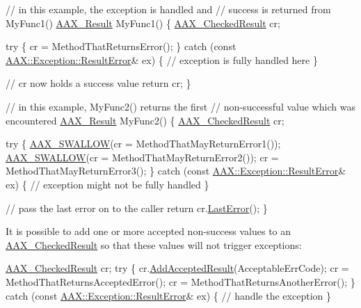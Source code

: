 \begin{DoxyCode}
\textcolor{comment}{// in this example, the exception is handled and}
\textcolor{comment}{// success is returned from MyFunc1()}
\hyperlink{a00149_a4d8f69a697df7f70c3a8e9b8ee130d2f}{AAX\_Result} MyFunc1()
\{
  \hyperlink{a00019}{AAX\_CheckedResult} cr;

  \textcolor{keywordflow}{try} \{
    cr = MethodThatReturnsError();
  \} \textcolor{keywordflow}{catch} (\textcolor{keyword}{const} \hyperlink{a00147}{AAX::Exception::ResultError}& ex) \{
    \textcolor{comment}{// exception is fully handled here}
  \}
  
  \textcolor{comment}{// cr now holds a success value}
  \textcolor{keywordflow}{return} cr;
\}

\textcolor{comment}{// in this example, MyFunc2() returns the first}
\textcolor{comment}{// non-successful value which was encountered}
\hyperlink{a00149_a4d8f69a697df7f70c3a8e9b8ee130d2f}{AAX\_Result} MyFunc2()
\{
  \hyperlink{a00019}{AAX\_CheckedResult} cr;

  \textcolor{keywordflow}{try} \{
    \hyperlink{a00208_a8f177823e9388c5163d1b402a9069bce}{AAX\_SWALLOW}(cr = MethodThatMayReturnError1());
    \hyperlink{a00208_a8f177823e9388c5163d1b402a9069bce}{AAX\_SWALLOW}(cr = MethodThatMayReturnError2());
    cr = MethodThatMayReturnError3();
  \} \textcolor{keywordflow}{catch} (\textcolor{keyword}{const} \hyperlink{a00147}{AAX::Exception::ResultError}& ex) \{
    \textcolor{comment}{// exception might not be fully handled}
  \}
  
  \textcolor{comment}{// pass the last error on to the caller}
  \textcolor{keywordflow}{return} cr.\hyperlink{a00019_ab562025cfed2205f683deb011cbb9416}{LastError}();
\}
\end{DoxyCode}


It is possible to add one or more accepted non-\/success values to an \hyperlink{a00019}{A\+A\+X\+\_\+\+Checked\+Result} so that these values will not trigger exceptions\+:


\begin{DoxyCode}
\hyperlink{a00019}{AAX\_CheckedResult} cr;
\textcolor{keywordflow}{try} \{
  cr.\hyperlink{a00019_af6c4b10c55e959f5f8424514a3cbb68a}{AddAcceptedResult}(AcceptableErrCode);
  cr = MethodThatReturnsAcceptedError();
  cr = MethodThatReturnsAnotherError();
\} \textcolor{keywordflow}{catch} (\textcolor{keyword}{const} \hyperlink{a00147}{AAX::Exception::ResultError}& ex) \{
  \textcolor{comment}{// handle the exception}
\}
\end{DoxyCode}
